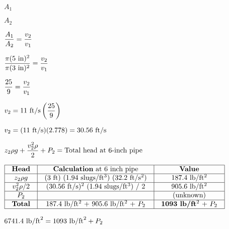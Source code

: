 \documentclass[12pt,a4paper,margin=2cm]{book}
\def\lthtmlcheckvsize{\ifdim\ht\sizebox<\vsize 
  \ifdim\wd\sizebox<\hsize\expandafter\hfill\fi \expandafter\vfill
  \else\expandafter\vss\fi}%
\begin{document}
{\newpage\clearpage
{}%
$ A_1$%
\lthtmlindisplaymathZ
\lthtmlcheckvsize\clearpage}

{\newpage\clearpage
{}%
$ A_2$%
\lthtmlindisplaymathZ
\lthtmlcheckvsize\clearpage}

{\newpage\clearpage
{}%
$\displaystyle {A_1 \over A_2} = {v_2 \over v_1}$%
\lthtmlindisplaymathZ
\lthtmlcheckvsize\clearpage}

{\newpage\clearpage
{}%
$\displaystyle {\pi (5\hbox{ in})^2 \over \pi (3\hbox{ in})^2} = {v_2 \over v_1}$%
\lthtmlindisplaymathZ
\lthtmlcheckvsize\clearpage}

{\newpage\clearpage
{}%
$\displaystyle {25 \over 9} = {v_2 \over v_1}$%
\lthtmlindisplaymathZ
\lthtmlcheckvsize\clearpage}

{\newpage\clearpage
{}%
$\displaystyle v_2 = 11 \hbox{ ft/s} \left({25 \over 9}\right)$%
\lthtmlindisplaymathZ
\lthtmlcheckvsize\clearpage}

{\newpage\clearpage
{}%
$\displaystyle v_2 = (11 \hbox{ ft/s}) (2.778) = 30.56 \hbox{ ft/s}$%
\lthtmlindisplaymathZ
\lthtmlcheckvsize\clearpage}

{\newpage\clearpage
{}%
$\displaystyle z_2 \rho g + {v_2^2 \rho \over 2} + P_2 = \hbox{Total head at 6-inch pipe}$%
\lthtmlindisplaymathZ
\lthtmlcheckvsize\clearpage}

{\newpage\clearpage
{}%
$\displaystyle \vbox{\offinterlineskip
\halign{\strut
\vrule \quad\hfil # \  \hfil & 
\vrule \quad\hfil # \  \hfil & 
\vrule \quad\hfil # \  \hfil \vrule \cr
\noalign{\hrule }
\textbf{Head} & \textbf{Calculation} at 6 inch pipe & \textbf{Value} \cr
\noalign{\hrule }
$z_2 \rho g$ & (3 ft) (1.94 slugs/ft$^{3}$) (32.2 ft/s$^{2}$) & 187.4 lb/ft$^{2}$ \cr
\noalign{\hrule }
$v_2^2 \rho / 2$ & (30.56 ft/s)$^{2}$ (1.94 slugs/ft$^{3}$) / 2 & 905.6 lb/ft$^{2}$ \cr
\noalign{\hrule }
$P_2$ &  & (unknown) \cr
\noalign{\hrule }
\textbf{Total} & 187.4 lb/ft$^{2}$ + 905.6 lb/ft$^{2}$ + $P_2$ & \textbf{1093 lb/ft$^{2}$} + $P_2$ \cr
\noalign{\hrule }
} %
}$%
\lthtmlindisplaymathZ
\lthtmlcheckvsize\clearpage}

{\newpage\clearpage
{}%
$\displaystyle 6741.4 \hbox{ lb/ft}^2 = 1093 \hbox{ lb/ft}^2 + P_2$%
\lthtmlindisplaymathZ
\lthtmlcheckvsize\clearpage}
\end{document}
